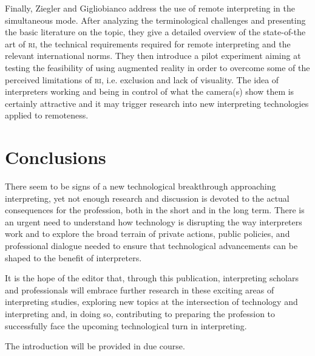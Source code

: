 \documentclass[output=paper]{langsci/langscibook}
\begin{document}
Finally, Ziegler and Gigliobianco address the use of remote interpreting in the simultaneous mode. After analyzing the terminological challenges and presenting the basic literature on the topic, they give a detailed overview of the state-of-the art of \textsc{ri}, the technical requirements required for remote interpreting and the relevant international norms. They then introduce a pilot experiment aiming at testing the feasibility of using augmented reality in order to overcome some of the perceived limitations of \textsc{ri}, i.e. exclusion and lack of visuality. The idea of interpreters working and being in control of what the camera(s) show them is certainly attractive and it may trigger research into new interpreting technologies applied to remoteness. 
 
\section{Conclusions} 
 
There seem to be signs of a new technological breakthrough approaching interpreting, yet not enough research and discussion is devoted to the actual consequences for the profession, both in the short and in the long term. There is an urgent need to understand how technology is disrupting the way interpreters work and to explore the broad terrain of private actions, public policies, and professional dialogue needed to ensure that technological advancements can be shaped to the benefit of interpreters. 

It is the hope of the editor that, through this publication, interpreting scholars and professionals will embrace further research in these exciting areas of interpreting studies, exploring new topics at the intersection of technology and interpreting and, in doing so, contributing to preparing the profession to successfully face the upcoming technological turn in interpreting.  

The introduction will be provided in due course.
\sloppy
\printbibliography[heading=subbibliography,notkeyword=this]
\end{document}
